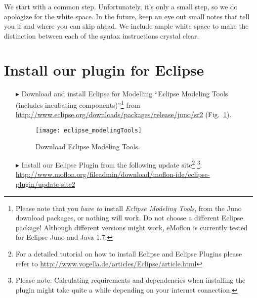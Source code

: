 \genHeader

We start with a common step. Unfortunately, it's only a small step, so we do apologize for the white space. In the future, keep an eye out small notes that tell you if and where you can skip ahead. We include ample white space to make the distinction between each of the syntax instructions crystal clear.

\section{Install our plugin for Eclipse}
 
\begin{itemize}
\item[$\blacktriangleright$] Download and install Eclipse for Modelling ``Eclipse Modeling Tools (includes incubating components)''\footnote{Please note that you \emph{have to} install \emph{Eclipse Modeling Tools}, from the Juno download packages, or nothing will work.  Do not choose a different Eclipse package!  Although different versions might work, eMoflon is currently tested for Eclipse Juno and Java 1.7.} from \url{http://www.eclipse.org/downloads/packages/release/juno/sr2} (Fig.~\ref{fig_downloadModelingPackage}).

\begin{figure}[htbp]
	\centering
  	\texttt{[image: eclipse\_modelingTools]}
	\caption{Download Eclipse Modeling Tools.}
	\label{fig_downloadModelingPackage}
\end{figure}

\pagebreak

\item[$\blacktriangleright$] Install our Eclipse Plugin from the following update site\footnote{For a detailed tutorial on how to install Eclipse and Eclipse Plugins please refer to \url{http://www.vogella.de/articles/Eclipse/article.html}} 
\footnote{Please note: Calculating requirements and dependencies when installing the plugin might take quite a while depending on your internet connection.}:
\url{http://www.moflon.org/fileadmin/download/moflon-ide/eclipse-plugin/update-site2}

\end{itemize}